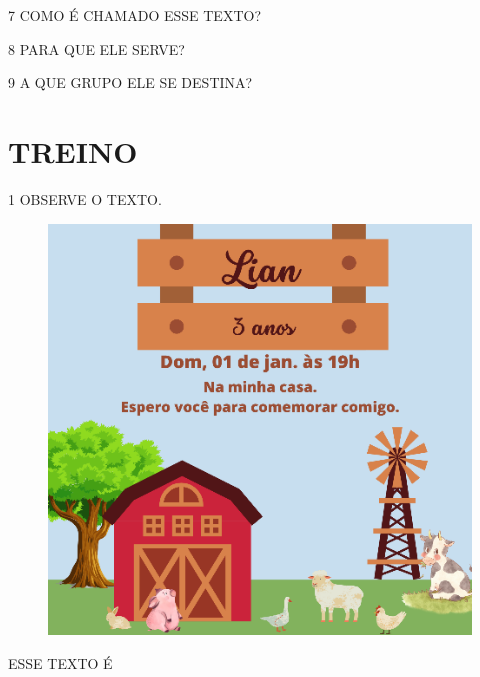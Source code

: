 
\num{7} COMO É CHAMADO ESSE TEXTO?


\num{8} PARA QUE ELE SERVE?


\num{9} A QUE GRUPO ELE SE DESTINA?


\section*{TREINO}


\num{1} OBSERVE O TEXTO.

\vspace{0.5cm}

\begin{figure}[H]
\centering
\includegraphics[width=\textwidth]{media/image157.png}
\end{figure}

ESSE TEXTO É


